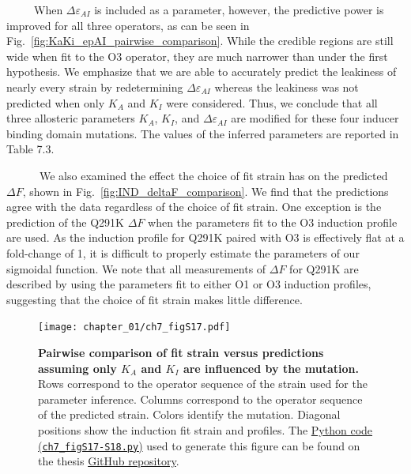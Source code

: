 \documentclass[12pt]{caltech_thesis}
\begin{document}
~~~~~When \(\Delta\varepsilon_{AI}\) is included as a parameter,
however, the predictive power is improved for all three operators, as
can be seen in Fig.~\ref{fig:KaKi_epAI_pairwise_comparison}. While the
credible regions are still wide when fit to the O3 operator, they are
much narrower than under the first hypothesis. We emphasize that we are
able to accurately predict the leakiness of nearly every strain by
redetermining \(\Delta\varepsilon_{AI}\) whereas the leakiness was not
predicted when only \(K_A\) and \(K_I\) were considered. Thus, we
conclude that all three allosteric parameters \(K_A\), \(K_I\), and
\(\Delta\varepsilon_{AI}\) are modified for these four inducer binding
domain mutations. The values of the inferred parameters are reported in
Table 7.3.

~~~~~~We also examined the effect the choice of fit strain has on the
predicted \(\Delta F\), shown in Fig.~\ref{fig:IND_deltaF_comparison}.
We find that the predictions agree with the data regardless of the
choice of fit strain. One exception is the prediction of the Q291K
\(\Delta F\) when the parameters fit to the O3 induction profile are
used. As the induction profile for Q291K paired with O3 is effectively
flat at a fold-change of 1, it is difficult to properly estimate the
parameters of our sigmoidal function. We note that all measurements of
\(\Delta F\) for Q291K are described by using the parameters fit to
either O1 or O3 induction profiles, suggesting that the choice of fit
strain makes little difference.

\hypertarget{fig:KaKi_only_pairwise_comparison}{%
\begin{figure}
\centering
\texttt{[image: chapter\_01/ch7\_figS17.pdf]}
\caption[{Pairwise comparison of fit strain versus predictions assuming
only \(K_A\) and \(K_I\) are influenced by mutations in the inducer
binding domain.}]{\textbf{Pairwise comparison of fit strain versus
predictions assuming only \(K_A\) and \(K_I\) are influenced by the
mutation.} Rows correspond to the operator sequence of the strain used
for the parameter inference. Columns correspond to the operator sequence
of the predicted strain. Colors identify the mutation. Diagonal
positions show the induction fit strain and profiles. The
\href{https://github.com/gchure/phd/blob/master/src/chapter_07/code/ch7_figS17-S18.py}{Python
code\\
(\texttt{ch7\_figS17-S18.py})} used to generate this figure can be found
on the thesis \href{https://github.com/gchure/phd}{GitHub repository}.}
\label{fig:KaKi_only_pairwise_comparison}
\end{figure}
}
\end{document}
